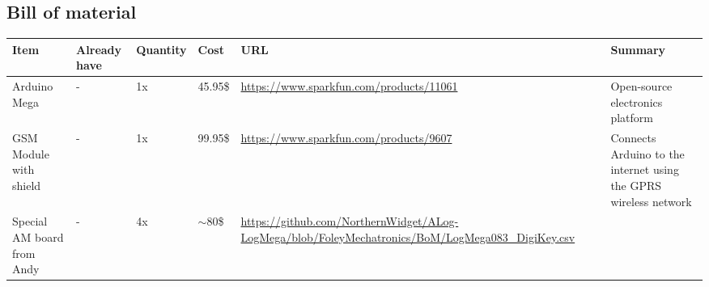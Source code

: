 \documentclass[12pt,a4paper,titlepage]{article}
\begin{document}
\subsection{Bill of material} %
\begin{center}
    \begin{tabular}{ | p{1.5cm} | p{1.4cm} | p{1.5cm} | l | p{5cm} | p{5cm} |}
    \hline
    Item & Already have & Quantity & Cost & URL & Summary \\ \hline
    
    Arduino Mega & - & 1x & 45.95\$ & \url{https://www.sparkfun.com/products/11061} & Open-source electronics platform \\ \hline
    
    GSM Module with shield & - & 1x & 99.95\$ & \url{https://www.sparkfun.com/products/9607} & Connects Arduino to the internet using the GPRS wireless network \\ \hline
    
	Special AM board from Andy & - & 4x & $\sim$80\$ & \url{https://github.com/NorthernWidget/ALog-LogMega/blob/FoleyMechatronics/BoM/LogMega083_DigiKey.csv} &  \\ \hline
    \end{tabular}
\end{center}
 



\end{document}

